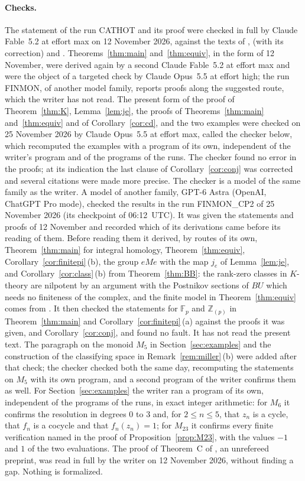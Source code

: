 \documentclass[11pt,a4paper]{article}
\theoremstyle{definition}
\newcommand{\Z}{\mathbb{Z}}
\newcommand{\F}{\mathbb{F}}
\newcommand{\Zp}{\Z_{(p)}}
\begin{document}
\paragraph{Checks.} The statement of the run CATHOT and its proof were
checked in full by Claude Fable~5.2 at effort max on 12 November 2026,
against the texts of \cite{BB}, \cite{Mi} (with its correction) and
\cite{At}. Theorems~\ref{thm:main} and~\ref{thm:equiv}, in the form of 12
November, were derived again by a second Claude Fable~5.2 at effort max and
were the object of a targeted check by Claude Opus~5.5 at effort high; the
run FINMON, of another model family, reports proofs along the suggested
route, which the writer has not read. The present form of the proof of
Theorem~\ref{thm:K}, Lemma~\ref{lem:je}, the proofs of
Theorems~\ref{thm:main} and~\ref{thm:equiv} and of Corollary~\ref{cor:cd},
and the two examples were checked on 25 November 2026 by Claude Opus~5.5 at
effort max, called the checker below, which recomputed the examples with a
program of its own, independent of the writer's program and of the programs
of the runs. The checker found no error in the proofs; at its indication
the last clause of Corollary~\ref{cor:conj} was corrected and several
citations were made more precise. The checker is a model of the same family
as the writer. A model of another family, GPT-6 Astra (OpenAI, ChatGPT Pro
mode), checked the results in the run FINMON\_CP2 of 25 November 2026 (its
checkpoint of 06:12~UTC). It was given the statements and proofs of 12
November and recorded which of its derivations came before its reading of
them. Before reading them it derived, by routes of its own,
Theorem~\ref{thm:main} for integral homology, Theorem~\ref{thm:equiv},
Corollary~\ref{cor:finitepi}\,(b), the group $eMe$ with the map $j_e$ of
Lemma~\ref{lem:je}, and Corollary~\ref{cor:class}\,(b) from
Theorem~\ref{thm:BB}: the rank-zero classes in $K$-theory are nilpotent by
an argument with the Postnikov sections of $BU$ which needs no finiteness of
the complex, and the finite model in Theorem~\ref{thm:equiv} comes from
\cite[Proposition~4C.1]{Ha}. It then checked the statements for $\F_p$ and
$\Zp$ in Theorem~\ref{thm:main} and Corollary~\ref{cor:finitepi}\,(a)
against the proofs it was given, and Corollary~\ref{cor:conj}, and found no
fault. It has not read the present text. The
paragraph on the monoid $M_5$ in Section~\ref{sec:examples} and the
construction of the classifying space in Remark~\ref{rem:miller}\,(b) were
added after that check; the checker checked both the same day, recomputing
the statements on $M_5$ with its own program, and a second program of the
writer confirms them as well. For
Section~\ref{sec:examples} the writer ran a program of its own,
independent of the programs of the runs, in exact integer arithmetic: for
$M_6$ it confirms the resolution in degrees $0$ to $3$ and, for
$2\le n\le5$, that $z_n$ is a cycle, that $f_n$ is a cocycle and that
$f_n(z_n)=1$; for $M_{23}$ it confirms every finite verification named in
the proof of Proposition~\ref{prop:M23}, with the values $-1$ and $1$ of the
two evaluations. The proof of Theorem~C of \cite{BB}, an unrefereed
preprint, was read in full by the writer on 12 November 2026, without
finding a gap. Nothing is formalized.
\end{document}
